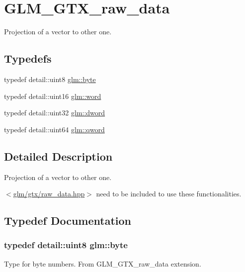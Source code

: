 \hypertarget{group__gtx__raw__data}{}\section{G\+L\+M\+\_\+\+G\+T\+X\+\_\+raw\+\_\+data}
\label{group__gtx__raw__data}


Projection of a vector to other one.  


\subsection*{Typedefs}
\begin{DoxyCompactItemize}
\item 
typedef detail\+::uint8 \hyperlink{group__gtx__raw__data_gacd7fe1f2ad60a57f7d7ad4f1e6836efd}{glm\+::byte}
\item 
typedef detail\+::uint16 \hyperlink{group__gtx__raw__data_ga5617a479d471021b5c773c5e969ba46d}{glm\+::word}
\item 
typedef detail\+::uint32 \hyperlink{group__gtx__raw__data_ga1fc2589df6d44e923cd1820cf14805cf}{glm\+::dword}
\item 
typedef detail\+::uint64 \hyperlink{group__gtx__raw__data_ga32447af289e879589883c9b7e3be1246}{glm\+::qword}
\end{DoxyCompactItemize}


\subsection{Detailed Description}
Projection of a vector to other one. 

$<$\hyperlink{raw__data_8hpp}{glm/gtx/raw\+\_\+data.\+hpp}$>$ need to be included to use these functionalities. 

\subsection{Typedef Documentation}
\subsubsection[{\texorpdfstring{byte}{byte}}]{\setlength{\rightskip}{0pt plus 5cm}typedef detail\+::uint8 {\bf glm\+::byte}}\hypertarget{group__gtx__raw__data_gacd7fe1f2ad60a57f7d7ad4f1e6836efd}{}\label{group__gtx__raw__data_gacd7fe1f2ad60a57f7d7ad4f1e6836efd}
Type for byte numbers. From G\+L\+M\+\_\+\+G\+T\+X\+\_\+raw\+\_\+data extension. 
